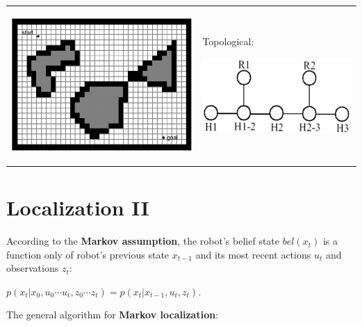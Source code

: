 \documentclass[landscape]{article}
\newcommand{\vmspace}{\vspace{-7pt}}
\newcommand{\vpspace}{\vspace{5pt}}
\newcommand{\vtspace}{\vspace{-10pt}}
\begin{document}
\begin{multicols}{3}
\begin{minipage}{\columnwidth}
\begin{tabular}{p{}p{}}
    \begin{center}
      \includegraphics[width=0.29\columnwidth]{img/8_Approx.png}
    \end{center}
    & Topological:\newline

    \vspace{-20pt}

    \begin{center}
      \includegraphics[width=0.38\columnwidth]{img/8_Topological.png}
    \end{center}


    \\[-15pt]
  \end{tabular}
\end{minipage}


\vfill

\vtspace

\section{Localization II}

\vmspace

\begin{minipage}{\columnwidth}
  According to the \textbf{Markov assumption}, the robot's belief state
  $bel(x_t)$ is a function only of robot's previous state $x_{t-1}$ and its most
  recent actions $u_t$ and observations $z_t$:
  \vmspace
  \begin{center}
    $
    p(x_t|x_0, u_0 \cdots u_t, z_0 \cdots z_t)
    =
    p(x_t|x_{t-1}, u_t, z_t).
    $
  \end{center}
\end{minipage}

\vpspace

\begin{minipage}{\columnwidth}
  The general algorithm for \textbf{Markov localization}:


\end{minipage}
\end{multicols}
\end{document}
